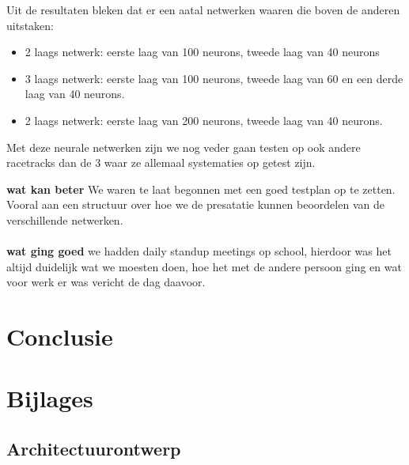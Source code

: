 \documentclass{article}
\begin{document}
Uit de resultaten bleken dat er een aatal netwerken waaren die boven de anderen uitstaken:
\begin{itemize}
\item 2 laags netwerk: eerste laag van 100 neurons, tweede laag van 40 neurons
\item 3 laags netwerk: eerste laag van 100 neurons, tweede laag van 60 en een derde laag van 40 neurons.
\item 2 laags netwerk: eerste laag van 200 neurons, tweede laag van 40 neurons. 
\end{itemize}
Met deze neurale netwerken zijn we nog veder gaan testen op ook andere racetracks dan de 3 waar ze allemaal systematies op getest zijn.


		

\textbf{wat kan beter}
We waren te laat begonnen met een goed testplan op te zetten. Vooral aan een structuur over hoe we de presatatie kunnen beoordelen van de verschillende netwerken. \\\\

\textbf{wat ging goed}
we hadden daily standup meetings op school, hierdoor was het altijd duidelijk wat we moesten doen, hoe het met de andere persoon ging en wat voor werk er was vericht de dag daavoor.


\section{Conclusie}
\pagebreak
\section{Bijlages}
\subsection{Architectuurontwerp}

\pagebreak


\pagebreak
\end{document}
